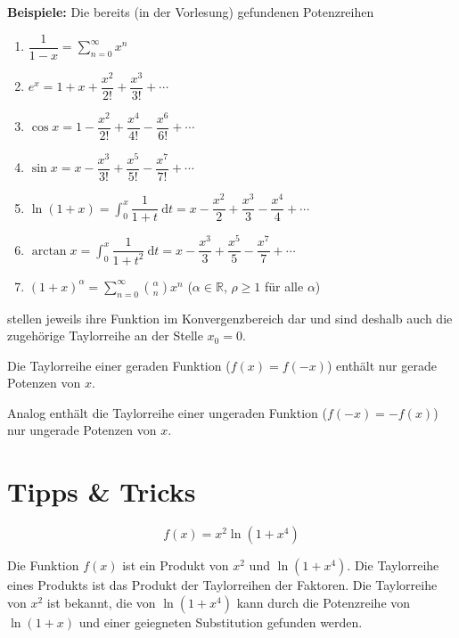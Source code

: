 \documentclass[12pt]{article}
\newcommand{\R}{\mathbb{R}} %
\newenvironment{problem}[2][\textcolor{blue}{Tipps \& Tricks zu}]{\begin{trivlist}
        \item[\hskip \labelsep {\bfseries #1}\hskip \labelsep {\bfseries \textcolor{blue}{#2}.}]}{\end{trivlist}}
\newenvironment{question}[2][\textcolor{red}{Aufgabe}]{\begin{trivlist}
        \item[\hskip \labelsep {\bfseries \textcolor{red}{#1}}\hskip \labelsep {\bfseries \textcolor{red}{#2}.}]}{\end{trivlist}}
\newenvironment{remark}[2][Bemerkung]{\begin{trivlist}
        \item[\hskip \labelsep {\bfseries #1}\hskip \labelsep {\bfseries #2.}]}{\end{trivlist}}
\begin{document}
\textbf{Beispiele:} Die bereits (in der Vorlesung) gefundenen Potenzreihen
\begin{spreadlines}{0.8em}
    \begin{enumerate}[label=(\roman*)]
        \item $\dfrac{1}{1-x}=\displaystyle\sum_{n=0}^{\infty}x^n$
        \item $e^x=1+x+\dfrac{x^2}{2!}+\dfrac{x^3}{3!}+\cdots$
        \item $\cos x=1-\dfrac{x^2}{2!}+\dfrac{x^4}{4!}-\dfrac{x^6}{6!}+\cdots$
        \item $\sin x=x-\dfrac{x^3}{3!}+\dfrac{x^5}{5!}-\dfrac{x^7}{7!}+\cdots$
        \item $\ln(1+x)=\displaystyle\int_0^x \dfrac{1}{1+t} \mathrm{~d} t=x-\dfrac{x^2}{2}+\dfrac{x^3}{3}-\dfrac{x^4}{4}+\cdots$
        \item $\arctan x=\displaystyle\int_0^x \dfrac{1}{1+t^2} \mathrm{~d} t=x-\dfrac{x^3}{3}+\dfrac{x^5}{5}-\dfrac{x^7}{7}+\cdots$
        \item $(1+x)^{\alpha}=\displaystyle\sum_{n=0}^{\infty}\binom{\alpha}{n}x^n$ ($\alpha\in\R$, $\rho\geq 1$ für alle $\alpha$)
    \end{enumerate}
\end{spreadlines}
stellen jeweils ihre Funktion im Konvergenzbereich dar und sind deshalb auch die zugehörige Taylorreihe an der Stelle $x_0=0$.

\begin{remark}{[Gerade und Ungerade Funktionen]}
    Die Taylorreihe einer geraden Funktion ($f(x)=f(-x)$) enthält nur gerade Potenzen von $x$.

    Analog enthält die Taylorreihe einer ungeraden Funktion ($f(-x)=-f(x)$) nur
    ungerade Potenzen von $x$.
\end{remark}

\section{Tipps \& Tricks}

\begin{question}{1b}
    [Berechnen Sie die Taylorreihe um $x_0 = 0$ der folgenden Funktionen $f$.]
    \begin{equation}
        f(x)=x^2 \ln \left(1+x^4\right)
    \end{equation}
\end{question}

\begin{problem}{1b}
Die Funktion $f(x)$ ist ein Produkt von $x^2$ und $\ln(1+x^4)$. Die Taylorreihe eines Produkts ist das Produkt der Taylorreihen der Faktoren. Die Taylorreihe von $x^2$ ist bekannt, die von $\ln(1+x^4)$ kann durch die Potenzreihe von $\ln(1+x)$ und einer geiegneten Substitution gefunden werden.
\end{problem}
\end{document}
